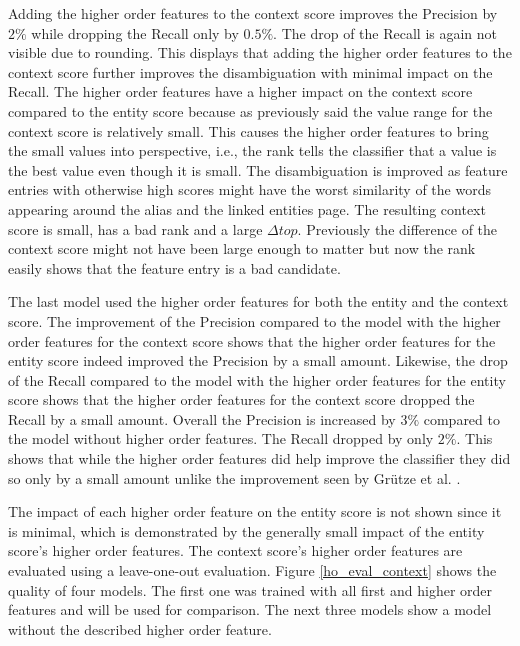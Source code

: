 Adding the higher order features to the context score improves the Precision by $2\%$ while dropping the Recall only by $0.5\%$. The drop of the Recall is again not visible due to rounding. This displays that adding the higher order features to the context score further improves the disambiguation with minimal impact on the Recall. The higher order features have a higher impact on the context score compared to the entity score because as previously said the value range for the context score is relatively small. This causes the higher order features to bring the small values into perspective, i.e., the rank tells the classifier that a value is the best value even though it is small. The disambiguation is improved as feature entries with otherwise high scores might have the worst similarity of the words appearing around the alias and the linked entities page. The resulting context score is small, has a bad rank and a large $\Delta top$. Previously the difference of the context score might not have been large enough to matter but now the rank easily shows that the feature entry is a bad candidate.\par
The last model used the higher order features for both the entity and the context score. The improvement of the Precision compared to the model with the higher order features for the context score shows that the higher order features for the entity score indeed improved the Precision by a small amount. Likewise, the drop of the Recall compared to the model with the higher order features for the entity score shows that the higher order features for the context score dropped the Recall by a small amount. Overall the Precision is increased by $3\%$ compared to the model without higher order features. The Recall dropped by only $2\%$. This shows that while the higher order features did help improve the classifier they did so only by a small amount unlike the improvement seen by Grütze et al. \cite{coheel}.\par
The impact of each higher order feature on the entity score is not shown since it is minimal, which is demonstrated by the generally small impact of the entity score's higher order features. The context score's higher order features are evaluated using a leave-one-out evaluation. Figure \ref{ho_eval_context} shows the quality of four models. The first one was trained with all first and higher order features and will be used for comparison. The next three models show a model without the described higher order feature.\par
